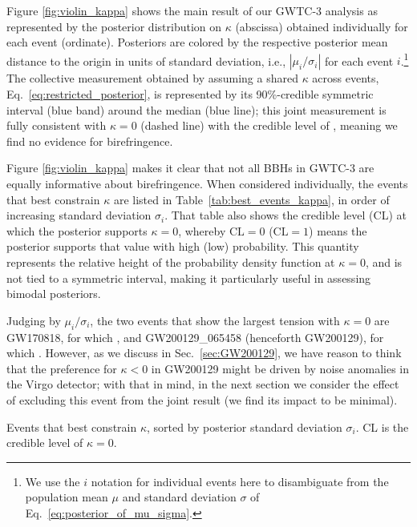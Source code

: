 \documentclass[aps,prd,twocolumn,superscriptaddress,preprintnumbers,nofootinbib]{revtex4-2}
\begin{document}
Figure \ref{fig:violin_kappa} shows the main result of our GWTC-3 analysis as represented by the posterior distribution on $\kappa$ (abscissa) obtained individually for each event (ordinate).
Posteriors are colored by the respective posterior mean distance to the origin in units of standard deviation, i.e., $|\mu_i/\sigma_i|$ for each event $i$.\footnote{We use the $i$ notation for individual events here to disambiguate from the population mean $\mu$ and standard deviation $\sigma$ of Eq.~\eqref{eq:posterior_of_mu_sigma}.}
The collective measurement obtained by assuming a shared $\kappa$ across events, Eq.~\eqref{eq:restricted_posterior}, is represented by its 90\%-credible symmetric interval (blue band) around the median (blue line); this joint measurement is fully consistent with $\kappa = 0$ (dashed line) with the credible level of , meaning we find no evidence for birefringence.

Figure \ref{fig:violin_kappa} makes it clear that not all \acp{BBH} in GWTC-3 are equally informative about birefringence.
When considered individually, the events that best constrain $\kappa$ are listed in Table~\ref{tab:best_events_kappa}, in order of increasing standard deviation $\sigma_i$.
That table also shows the credible level (CL) at which the posterior supports $\kappa = 0$, whereby $\mathrm{CL} = 0$ ($\mathrm{CL} = 1$) means the posterior supports that value with high (low) probability.
This quantity represents the relative height of the probability density function at $\kappa = 0$, and is not tied to a symmetric interval, making it particularly useful in assessing bimodal posteriors.

Judging by $\mu_i/\sigma_i$, the two events that show the largest tension with $\kappa = 0$ are GW170818, for which , and GW200129\_065458 (henceforth GW200129), for which .
However, as we discuss in Sec.~\ref{sec:GW200129}, we have reason to think that the preference for $\kappa < 0$ in GW200129 might be driven by noise anomalies in the Virgo detector; with that in mind, in the next section we consider the effect of excluding this event from the joint result (we find its impact to be minimal).

\begin{table}
    \caption{Events that best constrain $\kappa$, sorted by posterior standard deviation $\sigma_i$. CL is the credible level of $\kappa = 0$.}
    \begin{ruledtabular}
    \end{ruledtabular}
    \label{tab:best_events_kappa}
\end{table}
\end{document}
